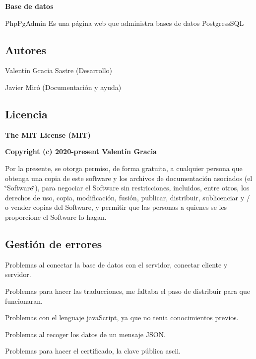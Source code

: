 {\bfseries Base de datos}
\begin{DoxyItemize}
\item Php\+Pg\+Admin Es una página web que administra bases de datos Postgress\+S\+QL
\end{DoxyItemize}

\subsection*{Autores}


\begin{DoxyItemize}
\item Valentín Gracia Sastre (Desarrollo)
\item Javier Miró (Documentación y ayuda)
\end{DoxyItemize}

\subsection*{Licencia}

{\bfseries The M\+IT License (M\+IT)}

{\bfseries Copyright (c) 2020-\/present Valentín Gracia}

Por la presente, se otorga permiso, de forma gratuita, a cualquier persona que obtenga una copia de este software y los archivos de documentación asociados (el \char`\"{}\+Software\char`\"{}), para negociar el Software sin restricciones, incluidos, entre otros, los derechos de uso, copia, modificación, fusión, publicar, distribuir, sublicenciar y / o vender copias del Software, y permitir que las personas a quienes se les proporcione el Software lo hagan.

\subsection*{Gestión de errores}


\begin{DoxyItemize}
\item Problemas al conectar la base de datos con el servidor, conectar cliente y servidor.
\item Problemas para hacer las traducciones, me faltaba el paso de distribuir para que funcionaran.
\item Problemas con el lenguaje java\+Script, ya que no tenia conocimientos previos.
\item Problemas al recoger los datos de un mensaje J\+S\+ON.
\item Problemas para hacer el certificado, la clave pública ascii. 
\end{DoxyItemize}